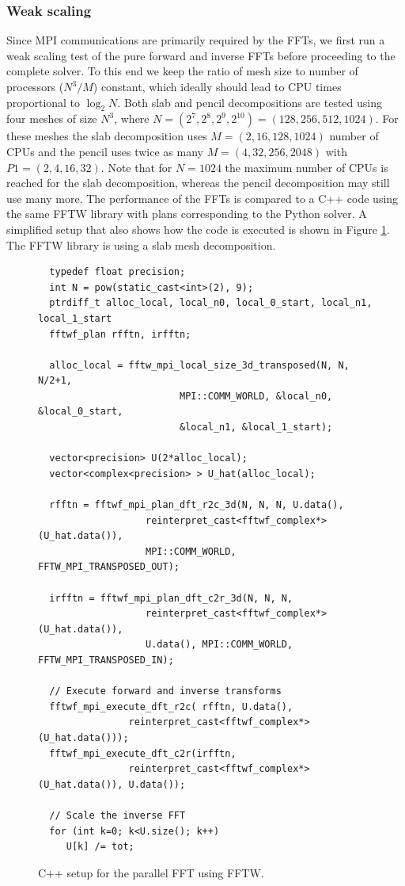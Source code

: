 \documentclass[final,3p,times,twocolumn]{elsarticle}
\begin{document}
\subsubsection{Weak scaling}
Since MPI communications are primarily required by the FFTs, we first run a 
weak scaling test of the pure forward and inverse FFTs before proceeding to the 
complete solver. To this end we keep the ratio of mesh size to number of 
processors ($N^3/M$) constant, which ideally should lead to CPU times 
proportional to $\log_2 N$. Both slab and pencil decompositions are tested 
using four meshes of size $N^3$, where $N=(2^7, 2^8, 2^9, 2^{10}) =(128, 256, 
512, 1024)$. For these meshes the slab decomposition uses 
$M=(2, 16, 128, 1024)$ number of CPUs and the pencil uses twice as many $M=(4, 
32, 256, 2048)$ with $P1=(2, 4, 16, 32)$.
Note that for $N=1024$ the maximum number of CPUs is reached for the slab decomposition, whereas the pencil
decomposition may still use many more. The performance of the FFTs is compared 
to a C++ code using the same FFTW library with plans corresponding to the 
Python solver. A simplified setup that also shows how the code is executed is 
shown in Figure \ref{fig:C++FFTW}. The FFTW library is using a slab mesh 
decomposition.

\begin{figure}[ht!]
\begin{lstlisting}
  typedef float precision;
  int N = pow(static_cast<int>(2), 9);
  ptrdiff_t alloc_local, local_n0, local_0_start, local_n1, local_1_start
  fftwf_plan rfftn, irfftn;
  
  alloc_local = fftw_mpi_local_size_3d_transposed(N, N, N/2+1, 
                         MPI::COMM_WORLD, &local_n0, &local_0_start,
                         &local_n1, &local_1_start);
                         
  vector<precision> U(2*alloc_local);
  vector<complex<precision> > U_hat(alloc_local);
  
  rfftn = fftwf_mpi_plan_dft_r2c_3d(N, N, N, U.data(), 
                   reinterpret_cast<fftwf_complex*>(U_hat.data()), 
                   MPI::COMM_WORLD, FFTW_MPI_TRANSPOSED_OUT);
                   
  irfftn = fftwf_mpi_plan_dft_c2r_3d(N, N, N, 
                   reinterpret_cast<fftwf_complex*>(U_hat.data()),  
                   U.data(), MPI::COMM_WORLD, FFTW_MPI_TRANSPOSED_IN);  
                   
  // Execute forward and inverse transforms
  fftwf_mpi_execute_dft_r2c( rfftn, U.data(), 
                reinterpret_cast<fftwf_complex*>(U_hat.data()));     
  fftwf_mpi_execute_dft_c2r(irfftn, 
                reinterpret_cast<fftwf_complex*>(U_hat.data()), U.data());
                
  // Scale the inverse FFT  
  for (int k=0; k<U.size(); k++)
     U[k] /= tot;

\end{lstlisting}
\caption{C++ setup for the parallel FFT using FFTW.}
\label{fig:C++FFTW}
\end{figure}
\end{document}
